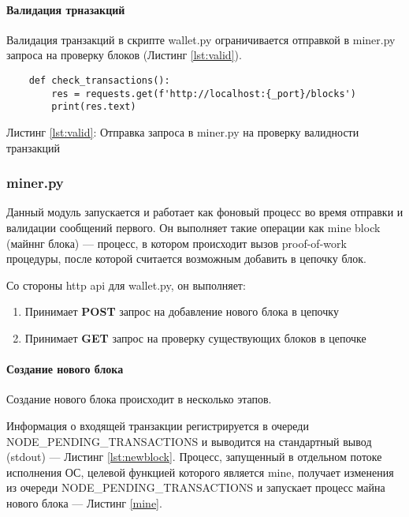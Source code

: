 \paragraph{Валидация трназакций}
Валидация транзакций в скрипте {\small wallet.py} ограничивается отправкой в
{\small miner.py} запроса на проверку блоков (Листинг \ref{lst:valid}).

\begin{center}
\begin{lstlisting}
    def check_transactions():
        res = requests.get(f'http://localhost:{_port}/blocks')
        print(res.text)
\end{lstlisting}\label{lst:valid}
    Листинг \ref{lst:valid}: Отправка запроса в {\small miner.py} на проверку
    валидности транзакций
\end{center}



\subsubsection{miner.py}
Данный модуль запускается и работает как фоновый процесс во время отправки и
валидации сообщений первого. Он выполняет такие операции как mine block (майннг
блока) --- процесс, в котором происходит вызов proof-of-work процедуры, после
которой считается возможным добавить в цепочку блок.

Со стороны http api для {\small wallet.py}, он выполняет:
\begin{enumerate}
    \item Принимает \textbf{POST} запрос на добавление нового блока в цепочку
    \item Принимает \textbf{GET} запрос на проверку существующих блоков в
          цепочке
\end{enumerate}

\paragraph{Создание нового блока}
Создание нового блока происходит в несколько этапов.

Информация о входящей транзакции регистрируется в очереди {\small
NODE\_PENDING\_TRANSACTIONS} и выводится на стандартный вывод (stdout) ---
Листинг \ref{lst:newblock}.  Процесс, запущенный в отдельном потоке исполнения
ОС, целевой функцией которого является mine, получает изменения из очереди
{\small NODE\_PENDING\_TRANSACTIONS} и запускает процесс майна нового блока ---
Листинг \ref{mine}.

